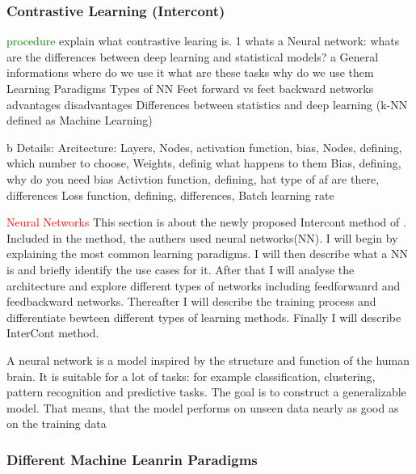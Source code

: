\subsubsection*{Contrastive Learning (Intercont)}

\textcolor{green}{procedure}
explain what contrastive learing is.
1 whats a Neural network: whats are the differences between deep learning and statistical models?
    a General informations
        where do we use it 
        what are these tasks
        why do we use them
        Learning Paradigms
        Types of NN
        Feet forward vs feet backward networks
        advantages disadvantages 
        Differences between statistics and deep learning (k-NN defined as Machine Learning)

    b Details: 
        Arcitecture: Layers, Nodes, activation function, bias,
        Nodes, defining, which number to choose,
        Weights, definig what happens to them
        Bias, defining, why do you need bias
        Activtion function, defining, hat type of af are there, differences
        Loss function, defining, differences, 
        Batch
        learning rate


\textcolor{red}{Neural Networks}
This section is about the newly proposed Intercont method of \citep{shenkar2022anomaly}. 
Included in the method, the authers used neural networks(NN).
I will begin by explaining the most common learning paradigms.
I will then describe what a NN is and briefly identify the use cases for it.
After that I will analyse the architecture and explore different types of networks including feedforwanrd and feedbackward networks.
Thereafter I will describe the training process and differentiate bewteen different types of learning methods.
Finally I will describe InterCont method.


A neural network is a model inspired by the structure and function of the human brain. 
It is suitable for a lot of tasks: for example classification, clustering, pattern recognition and predictive tasks.
The goal is to construct a generalizable model.
That means, that the model performs on unseen data nearly as good as on the training data 

\subsubsection{Different Machine Leanrin Paradigms}

